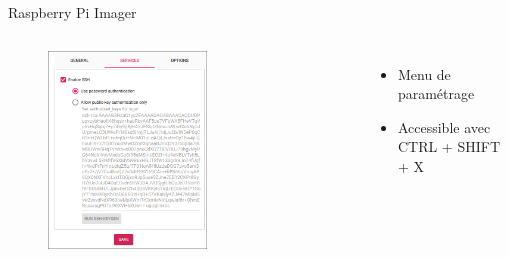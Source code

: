 \documentclass[aspectratio=169,xcolor=dvipsnames]{beamer}
\begin{document}
\begin{frame}{Raspberry Pi Imager}
    \begin{columns}[c] %

        \begin{figure}
            \includegraphics[width=0.6\textwidth]{images/rpi-imager-2.png}
        \end{figure}

        \begin{itemize}
            \item Menu de paramétrage
            \item Accessible avec CTRL + SHIFT + X
        \end{itemize}

    \end{columns}
\end{frame}

\end{document}
